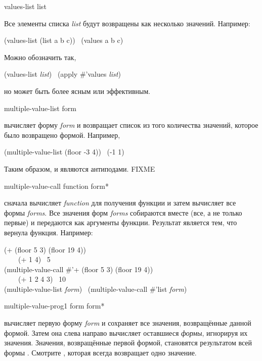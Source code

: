 \begin{defun}[Функция]
values-list list

Все элементы списка \emph{list} будут возвращены как несколько значений.
Например:
\begin{lisp}
(values-list (list a b c)) \EQ\ (values a b c)
\end{lisp}
Можно обозначить так,
\begin{lisp}
(values-list \emph{list}) \EQ\ (apply \#'values \emph{list})
\end{lisp}
но  может быть более ясным или эффективным.
\end{defun}

\begin{defmac}
multiple-value-list form

 вычисляет форму \emph{form} и возвращает список из
того количества значений, которое было возвращено формой.
Например,
\begin{lisp}
(multiple-value-list (floor -3 4)) \EV\ (-1 1)
\end{lisp}
Таким образом,  и  являются
антиподами. FIXME
\end{defmac}

\begin{defspec}
multiple-value-call function {form}*

 сначала вычисляет \emph{function} для получения
функции и затем вычисляет все формы \emph{forms}. Все значения форм \emph{forms}
собираются вместе (все, а не только первые) и передаются как аргументы
функции. Результат  является тем, что вернула функция.
Например:
\begin{lisp}
(+ (floor 5 3) (floor 19 4)) \\
~~~\EQ\ (+ 1 4) \EV\ 5 \\
(multiple-value-call \#'+ (floor 5 3) (floor 19 4)) \\
~~~\EQ\ (+ 1 2 4 3) \EV\ 10 \\
(multiple-value-list \emph{form}) \EQ\ (multiple-value-call \#'list \emph{form})
\end{lisp}
\end{defspec}

\begin{defspec}
multiple-value-prog1 form {form}*

 вычисляет первую форму \emph{form} и сохраняет все
значения, возвращённые данной формой. Затем она слева направо вычисляет оставшиеся
\emph{формы}, игнорируя их значения. Значения, возвращённые первой формой,
становятся результатом всей формы . Смотрите
, которая всегда возвращает одно значение.
\end{defspec}

